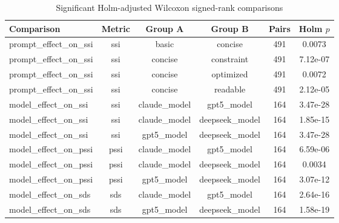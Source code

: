 \begin{table}[t]
\centering
\caption{Significant Holm-adjusted Wilcoxon signed-rank comparisons}
\label{tab:pairwise_tests}
\begin{tabular}{lccccc}
\toprule
Comparison & Metric & Group A & Group B & Pairs & Holm $p$ \\
\midrule
prompt\_effect\_on\_ssi & ssi & basic & concise & 491 & 0.0073 \\
prompt\_effect\_on\_ssi & ssi & concise & constraint & 491 & 7.12e-07 \\
prompt\_effect\_on\_ssi & ssi & concise & optimized & 491 & 0.0072 \\
prompt\_effect\_on\_ssi & ssi & concise & readable & 491 & 2.12e-05 \\
model\_effect\_on\_ssi & ssi & claude\_model & gpt5\_model & 164 & 3.47e-28 \\
model\_effect\_on\_ssi & ssi & claude\_model & deepseek\_model & 164 & 1.85e-15 \\
model\_effect\_on\_ssi & ssi & gpt5\_model & deepseek\_model & 164 & 3.47e-28 \\
model\_effect\_on\_pssi & pssi & claude\_model & gpt5\_model & 164 & 6.59e-06 \\
model\_effect\_on\_pssi & pssi & claude\_model & deepseek\_model & 164 & 0.0034 \\
model\_effect\_on\_pssi & pssi & gpt5\_model & deepseek\_model & 164 & 3.07e-12 \\
model\_effect\_on\_sds & sds & claude\_model & gpt5\_model & 164 & 2.64e-16 \\
model\_effect\_on\_sds & sds & gpt5\_model & deepseek\_model & 164 & 1.58e-19 \\
\bottomrule
\end{tabular}
\end{table}
